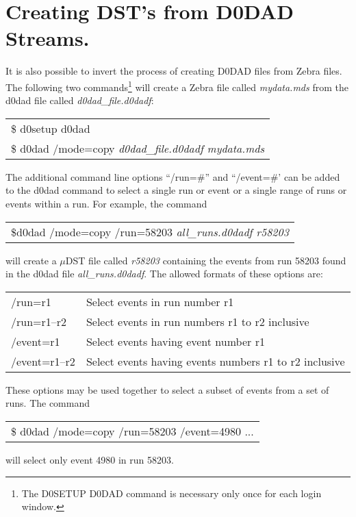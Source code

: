 \section{Creating DST's from D0DAD Streams.\label{ss-ug-copy}}
\par
It is also possible to invert the process of creating D0DAD files from Zebra
files.  The following two commands\footnote{The D0SETUP D0DAD command is 
necessary only once for each login window.} will create a Zebra file called
{\em mydata.mds} from the d0dad file called {\em d0dad\_file.d0dadf}:
\begin{center}
\begin{tabular}{l}
   \$ d0setup d0dad \\
   \$ d0dad /mode=copy {\em d0dad\_file.d0dadf mydata.mds} \\
\end{tabular}
\end{center}

\par
The additional command line options ``/run=\#'' and ``/event=\#' can be added
to the d0dad command to select a single run or event or a single range of runs
or events within a run.  For example, the command
\begin{center}
\begin{tabular}{l}
    \$d0dad /mode=copy /run=58203 {\em all\_runs.d0dadf r58203}
\end{tabular}
\end{center}
will create a $\mu$DST file called {\em r58203} containing the events from 
run 58203 found in the d0dad file {\em all\_runs.d0dadf}.  The allowed formats 
of these options are:
\begin{center}
\begin{tabular}{ll}
  /run=r1      & Select events in run number r1  \\
  /run=r1--r2  & Select events in run numbers r1 to r2 inclusive \\
  /event=r1    & Select events having event number r1   \\
  /event=r1--r2 & Select events having events numbers r1 to r2 inclusive \\
\end{tabular}
\end{center}
These options may be used together to select a subset of events from a set
of runs.  The command
\begin{center}
\begin{tabular}{l}
\$ d0dad /mode=copy /run=58203 /event=4980 ...
\end{tabular}
\end{center}
will select only event 4980 in run 58203.

